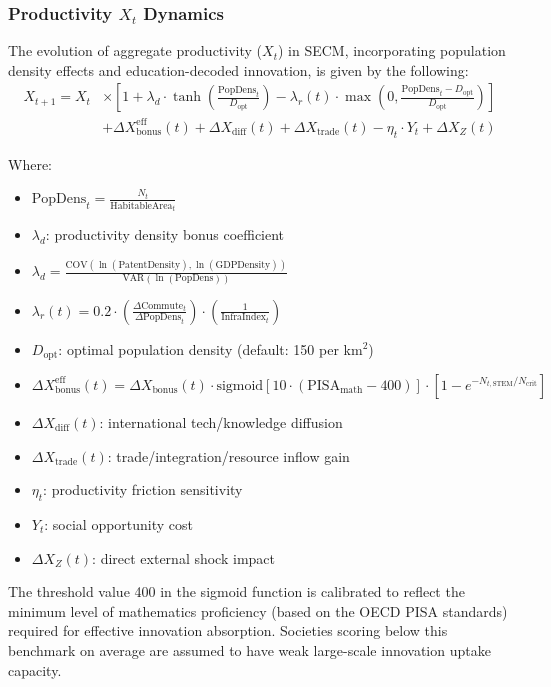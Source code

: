 \documentclass[12pt]{report}
\begin{document}
\subsubsection{Productivity $X_t$ Dynamics}
The evolution of aggregate productivity ($X_t$) in SECM, incorporating population density effects and education-decoded innovation, is given by the following:
\begin{align*}
X_{t+1} = X_t &\times \left[ 1 + \lambda_d \cdot \tanh\left(\frac{\text{PopDens}_t}{D_{\text{opt}}}\right) - \lambda_r(t) \cdot \max\left(0, \frac{\text{PopDens}_t - D_{\text{opt}}}{D_{\text{opt}}} \right) \right] \\
&+ \Delta X_{\text{bonus}}^{\text{eff}}(t) + \Delta X_{\text{diff}}(t) + \Delta X_{\text{trade}}(t) - \eta_t \cdot Y_t + \Delta X_Z(t)
\end{align*}

Where:
\begin{itemize}
  \item $\text{PopDens}_t = \frac{N_t}{\text{HabitableArea}_t}$
  \item $\lambda_d$: productivity density bonus coefficient
  \item $\lambda_d = \frac{\text{COV}(\ln(\text{PatentDensity}), \ln(\text{GDPDensity}))}{\text{VAR}(\ln(\text{PopDens}))}$
  \item $\lambda_r(t) = 0.2 \cdot \left(\frac{\Delta \text{Commute}_t}{\Delta \text{PopDens}_t}\right) \cdot \left(\frac{1}{\text{InfraIndex}_t}\right)$
  \item $D_{\text{opt}}$: optimal population density (default: 150 per km$^2$)
  \item $\Delta X_{\text{bonus}}^{\text{eff}}(t) = \Delta X_{\text{bonus}}(t) \cdot \text{sigmoid}\left[10 \cdot (\text{PISA}_{\text{math}} - 400)\right] \cdot \left[1 - e^{-N_{t,\text{STEM}} / N_{\text{crit}}} \right]$
  \item $\Delta X_{\text{diff}}(t)$: international tech/knowledge diffusion
  \item $\Delta X_{\text{trade}}(t)$: trade/integration/resource inflow gain
  \item $\eta_t$: productivity friction sensitivity
  \item $Y_t$: social opportunity cost
  \item $\Delta X_Z(t)$: direct external shock impact
\end{itemize}

The threshold value 400 in the sigmoid function is calibrated to reflect the minimum level of mathematics proficiency (based on the OECD PISA standards) required for effective innovation absorption. Societies scoring below this benchmark on average are assumed to have weak large-scale innovation uptake capacity.
\end{document}
